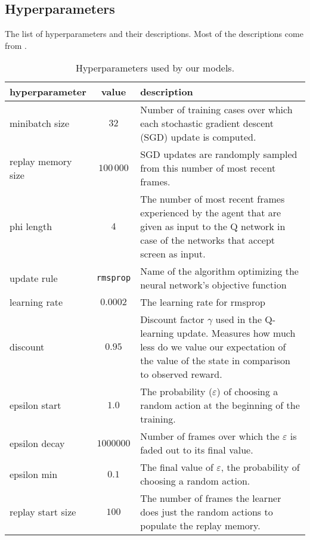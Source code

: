 \begin{appendices}
\chapter{Hyperparameters}\label{hyperparams}
The list of hyperparameters and their descriptions. Most of the descriptions come from \cite{nature-dqn}.
\begin{table}[h]
\begin{tabularx}{\textwidth}{@{} l c Y @{}}
\toprule
hyperparameter & value & description \\
\midrule
minibatch size & $32$ & Number of training cases over which each stochastic gradient descent (SGD) update is computed. \\\addlinespace
replay memory size & $100\,000$ & SGD updates are randomply sampled from this number of most recent frames. \\\addlinespace
phi length & $4$ & The number of most recent frames experienced by the agent that are given as input to the Q network in case of the networks that accept screen as input. \\\addlinespace
update rule & \texttt{rmsprop} &  Name of the algorithm optimizing the neural network's objective function   \\ \addlinespace
learning rate &  $0.0002$  & The learning rate for rmsprop\\ \addlinespace
discount & $0.95$ & Discount factor $\gamma$ used in the Q-learning update. Measures how much less do we value our expectation of the value of the state in comparison to observed reward.\\\addlinespace
epsilon start & $1.0$ & The probability ($\varepsilon$) of choosing a random action at the beginning of the training. \\\addlinespace
epsilon decay & $1000000$ & Number of frames over which the $\varepsilon$ is faded out to its final value. \\\addlinespace
epsilon min & $0.1$ & The final value of $\varepsilon$, the probability of choosing a random action. \\\addlinespace
replay start size & $100$ & The number of frames the learner does just the random actions to populate the replay memory.\\
\bottomrule
\end{tabularx}
\caption{Hyperparameters used by our models.}
\label{table:param}
\end{table}

\end{appendices}
